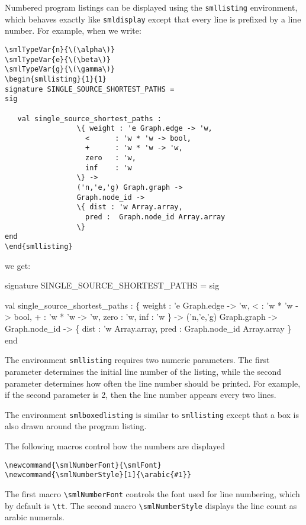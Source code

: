 \documentclass{article}
\begin{document}
Numbered program listings can be displayed using the
\verb|smllisting| environment, which behaves exactly like
\verb|smldisplay| except that every line is prefixed by a
line number.  For example, when we write:
\begin{verbatim}
\smlTypeVar{n}{\(\alpha\)}
\smlTypeVar{e}{\(\beta\)}
\smlTypeVar{g}{\(\gamma\)}
\begin{smllisting}{1}{1}
signature SINGLE_SOURCE_SHORTEST_PATHS =
sig

   val single_source_shortest_paths :
                 \{ weight : 'e Graph.edge -> 'w,
                   <      : 'w * 'w -> bool,
                   +      : 'w * 'w -> 'w,
                   zero   : 'w,
                   inf    : 'w
                 \} ->
                 ('n,'e,'g) Graph.graph ->
                 Graph.node_id ->
                 \{ dist : 'w Array.array,
                   pred :  Graph.node_id Array.array
                 \}
end
\end{smllisting}
\end{verbatim}
\noindent we get:
\begin{smllisting}{1}{1}
signature SINGLE_SOURCE_SHORTEST_PATHS =
sig

   val single_source_shortest_paths :
                 \{ weight : 'e Graph.edge -> 'w,
                   <      : 'w * 'w -> bool,
                   +      : 'w * 'w -> 'w,
                   zero   : 'w,
                   inf    : 'w
                 \} ->
                 ('n,'e,'g) Graph.graph ->
                 Graph.node_id ->
                 \{ dist : 'w Array.array,
                   pred :  Graph.node_id Array.array
                 \}
end
\end{smllisting}

The environment \verb|smllisting| requires two numeric parameters.
The first parameter determines the initial line number of the
listing, while the second parameter determines how often the line
number should be printed.  For example, if the second parameter
is 2, then the line number appears every two lines. 

The environment \verb|smlboxedlisting| is similar to 
\verb|smllisting| except that a box is also drawn around the program
listing.

The following macros control how the numbers are displayed
\begin{verbatim}
\newcommand{\smlNumberFont}{\smlFont}
\newcommand{\smlNumberStyle}[1]{\arabic{#1}}
\end{verbatim}
The first macro \verb|\smlNumberFont| controls the font used
for line numbering, which by default is \verb|\tt|.  
The second macro \verb|\smlNumberStyle| displays the line count as
arabic numerals.  
\end{document}
